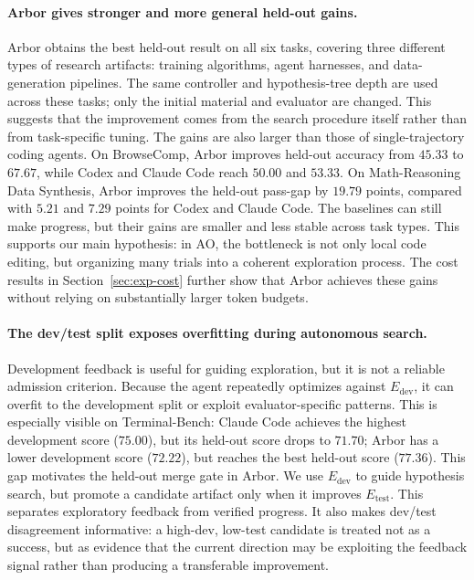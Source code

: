\documentclass{llmxive}
\begin{document}
\paragraph{Arbor gives stronger and more general held-out gains.}
Arbor obtains the best held-out result on all six tasks, covering three different types of research artifacts: training algorithms, agent harnesses, and data-generation pipelines. The same controller and hypothesis-tree depth are used across these tasks; only the initial material and evaluator are changed. This suggests that the improvement comes from the search procedure itself rather than from task-specific tuning.
The gains are also larger than those of single-trajectory coding agents. On BrowseComp, Arbor improves held-out accuracy from $45.33$ to $67.67$, while Codex and Claude Code reach $50.00$ and $53.33$. On Math-Reasoning Data Synthesis, Arbor improves the held-out pass-gap by $19.79$ points, compared with $5.21$ and $7.29$ points for Codex and Claude Code. The baselines can still make progress, but their gains are smaller and less stable across task types. This supports our main hypothesis: in AO, the bottleneck is not only local code editing, but organizing many trials into a coherent exploration process. The cost results in Section~\ref{sec:exp-cost} further show that Arbor achieves these gains without relying on substantially larger token budgets.

\paragraph{The dev/test split exposes overfitting during autonomous search.}
Development feedback is useful for guiding exploration, but it is not a reliable admission criterion. Because the agent repeatedly optimizes against $E_{\mathrm{dev}}$, it can overfit to the development split or exploit evaluator-specific patterns. This is especially visible on Terminal-Bench: Claude Code achieves the highest development score ($75.00$), but its held-out score drops to $71.70$; Arbor has a lower development score ($72.22$), but reaches the best held-out score ($77.36$).
This gap motivates the held-out merge gate in Arbor. We use $E_{\mathrm{dev}}$ to guide hypothesis search, but promote a candidate artifact only when it improves $E_{\mathrm{test}}$. This separates exploratory feedback from verified progress. It also makes dev/test disagreement informative: a high-dev, low-test candidate is treated not as a success, but as evidence that the current direction may be exploiting the feedback signal rather than producing a transferable improvement.
\end{document}
